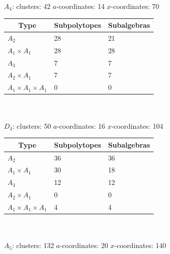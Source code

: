 \documentclass[11pt]{article}
\begin{document}
{\Large \underline{\(A_4\)}:} \quad clusters: 42 \qquad \(a\)-coordinates: 14 \qquad \(x\)-coordinates: 70\\ 

\begin{tabular}{ | l | l | l |}
\multicolumn{1}{c}{Type} &  \multicolumn{1}{c}{Subpolytopes}  &  \multicolumn{1}{c}{Subalgebras} \\
\hline \(A_2\) & 28 & 21 \\ 
\hline \(A_1 \times A_1\) & 28 & 28 \\ \hline 
\hline \(A_3\) & 7 & 7 \\ 
\hline \(A_2 \times A_1\) & 7 & 7 \\ 
\hline \(A_1 \times A_1 \times A_1\) & 0 & 0 \\ 
\hline
\end{tabular} \\ \\ 

{\Large\underline{\(D_4\)}:} \quad clusters: 50 \qquad \(a\)-coordinates: 16 \qquad \(x\)-coordinates: 104\\

\begin{tabular}{ | l | l | l |}
\multicolumn{1}{c}{Type} &  \multicolumn{1}{c}{Subpolytopes}  &  \multicolumn{1}{c}{Subalgebras} \\
\hline \(A_2\) & 36 & 36 \\ 
\hline \(A_1 \times A_1\) & 30 & 18 \\ \hline 
\hline \(A_3\) & 12 & 12 \\ 
\hline \(A_2 \times A_1\) & 0 & 0 \\ 
\hline \(A_1 \times A_1 \times A_1\) & 4 & 4 \\ 
\hline
\end{tabular} \\ \\

{\Large\underline{\(A_5\)}:} \quad clusters: 132 \qquad \(a\)-coordinates: 20 \qquad \(x\)-coordinates: 140\\
\end{document}
